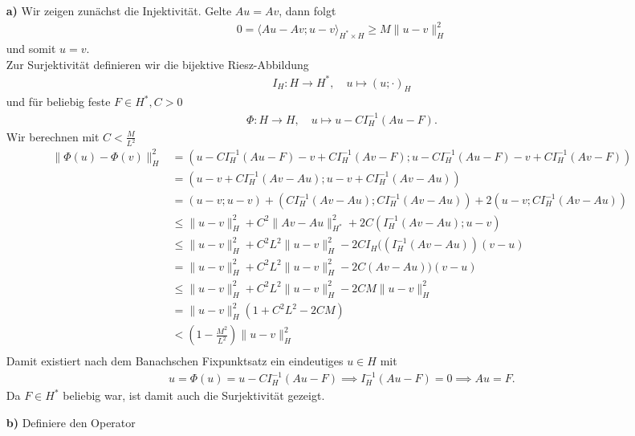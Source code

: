 \begin{solution}
\phantom{}
\begin{itemize}
  \item[\textbf{a)}] Wir zeigen zunächst die Injektivität. Gelte $Au = Av$, dann folgt
  \begin{align*}
    0 = \langle Au - Av; u - v \rangle_{H^*\times H}
    \geq M\|u -v\|_H^2
  \end{align*}
  und somit $u = v$. \\
  Zur Surjektivität definieren wir die bijektive Riesz-Abbildung
  \begin{align*}
    I_H: H \to H^*, \quad u \mapsto (u;\cdot)_H
  \end{align*}
  und für beliebig feste $F \in H^*, C > 0$
  \begin{align*}
    \Phi: H \to H, \quad u \mapsto u - CI_H^{-1}(Au - F).
  \end{align*}
  Wir berechnen mit $C < \frac{M}{L^2}$
  \begin{align*}
    \|\Phi(u) - \Phi(v)\|_H^2 &= (u - CI_H^{-1}(Au - F) -v + CI_H^{-1}(Av - F); u - CI_H^{-1}(Au - F) -v + CI_H^{-1}(Av - F)) \\
    &= (u  -v + CI_H^{-1}(Av - Au); u -v + CI_H^{-1}(Av - Au)) \\
    &= (u  - v; u - v) + (CI_H^{-1}(Av - Au); CI_H^{-1}(Av - Au)) + 2(u-v; CI_H^{-1}(Av - Au)) \\
    &\leq \|u - v\|_H^2 + C^2\|Av - Au\|_{H^*}^2 + 2C(I_H^{-1}(Av - Au); u-v) \\
    &\leq \|u - v\|_H^2 + C^2L^2\|u - v\|_{H}^2  - 2C I_H((I_H^{-1}(Av - Au))(v-u) \\
    &= \|u - v\|_H^2 + C^2L^2\|u - v\|_{H}^2 - 2C (Av - Au))(v-u) \\
    &\leq \|u - v\|_H^2 + C^2L^2\|u - v\|_{H}^2 - 2CM\|u-v\|_H^2\\
    &= \|u - v\|_H^2(1 + C^2L^2 - 2CM)\\
    &< \left(1 - \frac{M^2}{L^2}\right)\|u - v\|_H^2\\
  \end{align*}
  Damit existiert nach dem Banachschen Fixpunktsatz ein eindeutiges $u \in H$ mit
  \begin{align*}
    u = \Phi(u) = u - CI_H^{-1}(Au - F)
    \implies I_H^{-1}(Au - F) = 0 \implies Au = F.
  \end{align*}
  Da $F \in H^*$ beliebig war, ist damit auch die Surjektivität gezeigt.
  \item[\textbf{b)}] Definiere den Operator
  \begin{align*}

\end{align*}
\end{itemize}
\end{solution}
